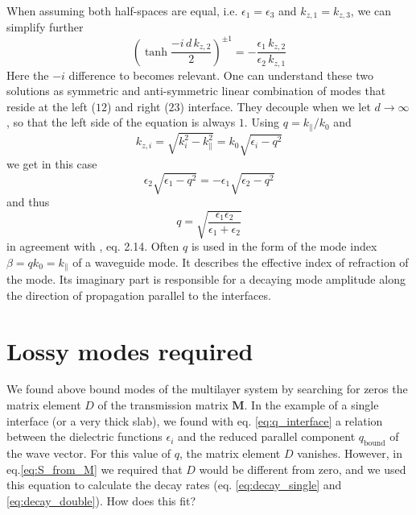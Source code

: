  When assuming both half-spaces are equal, i.e. $\epsilon_1 = \epsilon_3$ and $k_{z,1} = k_{z,3}$, we can simplify further
\begin{equation}
 \left( \tanh\frac{ -i \, d \, k_{z,2}  }{2} \right)^{\pm 1} = - \frac{ \epsilon_1 \, k_{z,2}  }{ \epsilon_2 \, k_{z,1} }
\end{equation} 
Here the $-i$ difference to \cite{Maier2007} becomes relevant.
One can understand these two solutions as symmetric and anti-symmetric linear combination of modes that reside at the left ($12$)  and right ($23$) interface. They decouple when we let $d \rightarrow \infty$, so that the left side of the equation is always $1$. Using $q = k_\parallel / k_0$ and
\begin{equation}
k_{z,i} = \sqrt{k_i^2 - k_\parallel^2} = k_0 \sqrt{\epsilon_i  - q^2}
\end{equation}
we get in this case
\begin{equation}
\epsilon_2 \sqrt{\epsilon_1 - q^2} = - \epsilon_1 \sqrt{\epsilon_2 - q^2}
\end{equation}
and thus 
\begin{equation}
q  = \sqrt{\frac{\epsilon_1 \epsilon_2}{\epsilon_1 + \epsilon_2}}
\label{eq:q_interface}
\end{equation}
in agreement with \cite{Maier2007}, eq. 2.14. Often $q$ is used in the form of the mode index $\beta = q k_0 = k_\parallel$ of a waveguide mode. It describes the effective index of refraction of the mode. Its imaginary part is responsible for a decaying mode amplitude along the direction of propagation parallel to the interfaces.


\section{Lossy modes required}

We found above bound modes of the multilayer system by searching for zeros the matrix element $D$ of the transmission matrix $\mathbf{M}$. In the example of a single interface (or a very thick slab), we found with eq. \ref{eq:q_interface} a relation between the dielectric functions $\epsilon_i$ and the reduced parallel component $q_\text{bound}$ of the wave vector. For this value of $q$, the matrix element $D$ vanishes. However, in eq.\ref{eq:S_from_M} we required that $D$ would be different from zero, and we used this equation to calculate the decay rates (eq. \ref{eq:decay_single} and \ref{eq:decay_double}).
How does this fit?
%
%


